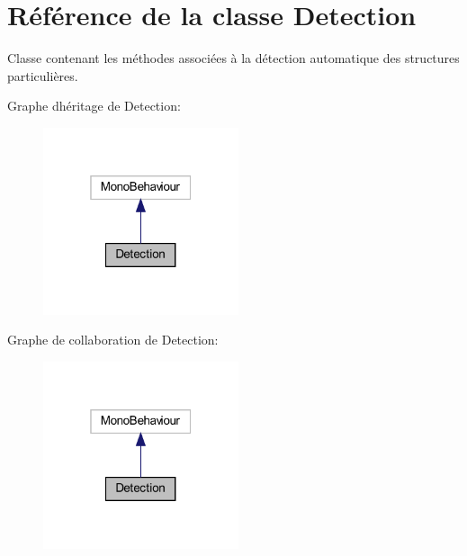 \hypertarget{class_detection}{}\section{Référence de la classe Detection}
\label{class_detection}


Classe contenant les méthodes associées à la détection automatique des structures particulières.  




Graphe d\textquotesingle{}héritage de Detection\+:\nopagebreak
\begin{figure}[H]
\begin{center}
\leavevmode
\includegraphics[width=163pt]{class_detection__inherit__graph}
\end{center}
\end{figure}


Graphe de collaboration de Detection\+:\nopagebreak
\begin{figure}[H]
\begin{center}
\leavevmode
\includegraphics[width=163pt]{class_detection__coll__graph}
\end{center}
\end{figure}
